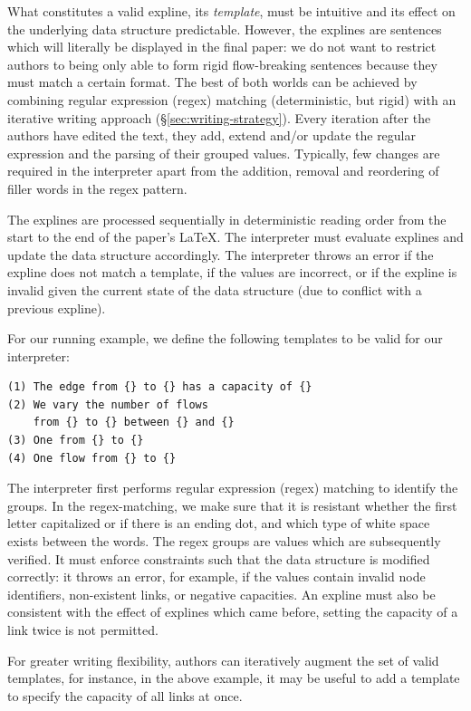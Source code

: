 What constitutes a valid expline, its \textit{template}, must be intuitive and its effect on the underlying data structure predictable. However, the explines are sentences which will literally be displayed in the final paper: we do not want to restrict authors to being only able to form rigid flow-breaking sentences because they must match a certain format. The best of both worlds can be achieved by combining regular expression (regex) matching (deterministic, but rigid) with an iterative writing approach (\S\ref{sec:writing-strategy}). Every iteration after the authors have edited the text, they add, extend and/or update the regular expression and the parsing of their grouped values. Typically, few changes are required in the interpreter apart from the addition, removal and reordering of filler words in the regex pattern.

The explines are processed sequentially in deterministic reading order from the start to the end of the paper's LaTeX. The interpreter must evaluate explines and update the data structure accordingly. The interpreter throws an error if the expline does not match a template, if the values are incorrect, or if the expline is invalid given the current state of the data structure (\eg due to conflict with a previous expline).

For our running example, we define the following templates to be valid for our interpreter:
\vspace{-0in}
\begin{verbatim}
(1) The edge from {} to {} has a capacity of {}
(2) We vary the number of flows 
    from {} to {} between {} and {}
(3) One from {} to {}
(4) One flow from {} to {}
\end{verbatim}
\vspace{-0in}
\noindent The interpreter first performs regular expression (regex) matching to identify the groups. In the regex-matching, we make sure that it is resistant whether the first letter capitalized or if there is an ending dot, and which type of white space exists between the words. The regex groups are values which are subsequently verified. It must enforce constraints such that the data structure is modified correctly: it throws an error, for example, if the values contain invalid node identifiers, non-existent links, or negative capacities. An expline must also be consistent with the effect of explines which came before, \eg setting the capacity of a link twice is not permitted. 

For greater writing flexibility, authors can iteratively augment the set of valid templates, for instance, in the above example, it may be useful to add a template to specify the capacity of all links at once.

